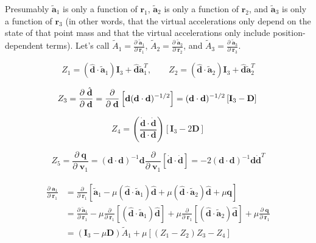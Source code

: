 \documentclass[]{article}
\newcommand{\pd}[2]{\frac{\partial\;#1}{\partial\;#2}}
\newcommand{\pddown}[2]{\frac{\partial}{\partial\;#2} \left[ #1 \right] }
\begin{document}
	Presumably $\tilde{\mathbf{a}}_1$ is only a function of $\mathbf{r}_1$, $\tilde{\mathbf{a}}_2$ is only a function of $\mathbf{r}_2$, and $\tilde{\mathbf{a}}_3$ is only a function of $\mathbf{r}_3$ (in other words, that the virtual accelerations only depend on the state of that point mass and that the virtual accelerations only include position-dependent terms).  Let's call $\tilde{A}_1 = \pd{\tilde{\mathbf{a}}_1}{\mathbf{r}_1}$, $\tilde{A}_2 = \pd{\tilde{\mathbf{a}}_2}{\mathbf{r}_2}$, and $\tilde{A}_3 = \pd{\tilde{\mathbf{a}}_3}{\mathbf{r}_3}$.


	\begin{equation*}
		Z_1 = (\hat{\mathbf{d}} \cdot \tilde{\mathbf{a}}_1) \mathbf{I}_3 + \hat{\mathbf{d}} \tilde{\mathbf{a}}_1^T,\quad\quad Z_2 = (\hat{\mathbf{d}} \cdot \tilde{\mathbf{a}}_2) \mathbf{I}_3 + \hat{\mathbf{d}} \tilde{\mathbf{a}}_2^T
	\end{equation*}

	\begin{equation*}
	Z_3 = \pd{\hat{\mathbf{d}}}{\mathbf{d}} = \pddown{\mathbf{d} (\mathbf{d}\cdot\mathbf{d})^{-1/2}}{\mathbf{d}} = (\mathbf{d}\cdot\mathbf{d})^{-1/2} \left[ \mathbf{I}_3 - \mathbf{D} \right] \\
	\end{equation*}

	\begin{equation*}
		Z_4 = \left( \frac{\dot{\mathbf{d}}\cdot \dot{\mathbf{d}}}{\mathbf{d} \cdot \mathbf{d}} \right) \left[ \mathbf{I}_3 - 2 \mathbf{D} \right]
	\end{equation*}

	\begin{equation*}
		Z_5 = \pd{\mathbf{q}}{\mathbf{v}_1} = (\mathbf{d} \cdot \mathbf{d})^{-1} \mathbf{d} \pddown{\dot{\mathbf{d}} \cdot \dot{\mathbf{d}}}{\mathbf{v}_1} = -2 (\mathbf{d} \cdot \mathbf{d})^{-1} \mathbf{d} \dot{\mathbf{d}}^T
	\end{equation*}

	\begin{align*}
	\begin{split}
		\pd{\mathbf{a}_1}{\mathbf{r}_1} &= \pddown{\tilde{\mathbf{a}}_1 - \mu  (\hat{\mathbf{d}} \cdot \tilde{\mathbf{a}}_1) \hat{\mathbf{d}} + \mu  (\hat{\mathbf{d}}\cdot  \tilde{\mathbf{a}}_2) \hat{\mathbf{d}} + \mu \mathbf{q}}{\mathbf{r}_1} \\ &= \pd{\tilde{\mathbf{a}}_1}{\mathbf{r}_1} - \mu \pddown{  (\hat{\mathbf{d}} \cdot \tilde{\mathbf{a}}_1) \hat{\mathbf{d}}}{\mathbf{r}_1} + \mu \pddown{  (\hat{\mathbf{d}}\cdot  \tilde{\mathbf{a}}_2) \hat{\mathbf{d}}}{\mathbf{r}_1} + \mu \pd{\mathbf{q}}{\mathbf{r}_1} \\ &= (\mathbf{I}_3 - \mu \mathbf{D})\tilde{A}_1 + \mu [(Z_1 - Z_2) Z_3 - Z_4] \\
	\end{split}
	\end{align*}
\end{document}
